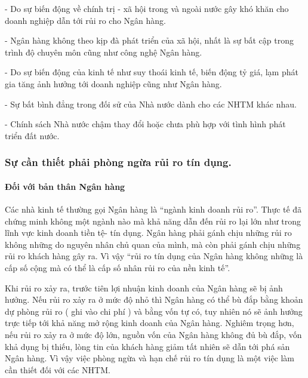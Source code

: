 - Do sự biến động về chính trị - xã hội trong và ngoài nước gây khó khăn cho doanh nghiệp dẫn tới rủi ro cho Ngân hàng.

- Ngân hàng không theo kịp đà phát triển của xã hội, nhất là sự bất cập trong trình độ chuyên môn cũng như công nghệ Ngân hàng.

- Do sự biến động của kinh tế như suy thoái kinh tế, biến động tỷ giá, lạm phát gia tăng ảnh hưởng tới doanh nghiệp cũng như Ngân hàng.

- Sự bất bình đẳng trong đối sử của Nhà nước dành cho các NHTM khác nhau.

- Chính sách Nhà nước chậm thay đổi hoặc chưa phù hợp với tình hình phát triển đất nước.

\subsubsection{Sự cần thiết phải phòng ngừa rủi ro tín dụng.}

\paragraph{Đối với bản thân Ngân hàng}
Các nhà kinh tế thường gọi Ngân hàng là “ngành kinh doanh rủi ro”. Thực tế đã chứng minh không một ngành nào mà khả năng dẫn đến rủi ro lại lớn như trong lĩnh vực kinh doanh tiền tệ- tín dụng. Ngân hàng phải gánh chịu những rủi ro không những do nguyên nhân chủ quan của mình, mà còn phải gánh chịu những rủi ro khách hàng gây ra. Vì vậy “rủi ro tín dụng của Ngân hàng không những là cấp số cộng mà có thể là cấp số nhân rủi ro của nền kinh tế”.

Khi rủi ro xảy ra, trước tiên lợi nhuận kinh doanh của Ngân hàng sẽ bị ảnh hưởng. Nếu rủi ro xảy ra ở mức độ nhỏ thì Ngân hàng có thể bù đắp bằng khoản dự phòng rủi ro ( ghi vào chi phí ) và bằng vốn tự có, tuy nhiên nó sẽ ảnh hưởng trực tiếp tới khả năng mở rộng kinh doanh của Ngân hàng. Nghiêm trọng hơn, nếu rủi ro xảy ra ở mức độ lớn, nguồn vốn của Ngân hàng không đủ bù đắp, vốn khả dụng bị thiếu, lòng tin của khách hàng giảm tất nhiên sẽ dẫn tới phá sản Ngân hàng. Vì vậy việc phòng ngừa và hạn chế rủi ro tín dụng là một việc làm cần thiết đối với các NHTM.

